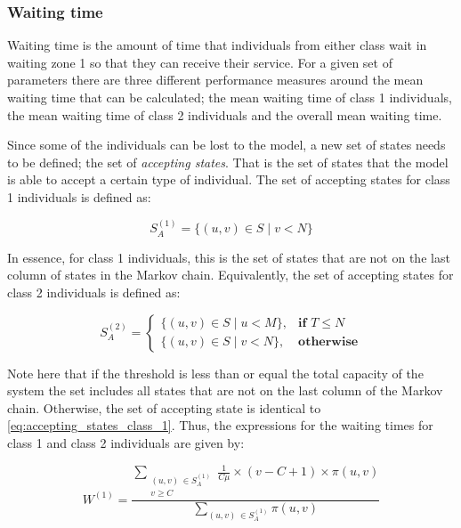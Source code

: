 \subsubsection{Waiting time} \label{sec:waiting_time}

Waiting time is the amount of time that individuals from either class wait in 
waiting zone 1 so that they can receive their service. 
For a given set of parameters there are three different performance measures 
around the mean waiting time that can be calculated; the mean waiting time of
class 1 individuals, the mean waiting time of class 2 individuals and the 
overall mean waiting time. 

Since some of the individuals can be lost to the model, a new set of states 
needs to be defined; the set of \textit{accepting states}. 
That is the set of states that the model is able to accept a certain type of
individual. 
The set of accepting states for class 1 individuals is defined as:

\begin{equation}\label{eq:accepting_states_class_1}
    S_A^{(1)} = \{(u, v) \in S \; | \; v < N \}
\end{equation}

In essence, for class 1 individuals, this is the set of states that are not on 
the last column of states in the Markov chain.
Equivalently, the set of accepting states for class 2 individuals is defined as:

\begin{equation}\label{eq:accepting_states_class_2}
    S_A^{(2)}=
    \begin{cases}
        \{(u, v) \in S \; | \; u < M \}, & \textbf{if } T \leq N\\
        \{(u, v) \in S \; | \; v < N \}, & \textbf{otherwise}
    \end{cases}
\end{equation}

Note here that if the threshold is less than or equal the total capacity of the
system the set includes all states that are not on the last column of the 
Markov chain.
Otherwise, the set of accepting state is identical to 
\ref{eq:accepting_states_class_1}. Thus, the expressions for the waiting times 
for class 1 and class 2 individuals are given by:

\begin{equation} \label{eq:closed_form_waiting_class_1}
    W^{(1)} = \frac{\sum_{\substack{(u,v) \, \in S_A^{(1)} \\ v \geq C}} 
    \frac{1}{C \mu} \times (v-C+1) \times \pi(u,v)}{\sum_{(u,v) \, 
    \in S_A^{(1)}} \pi(u,v)}
\end{equation}
    
